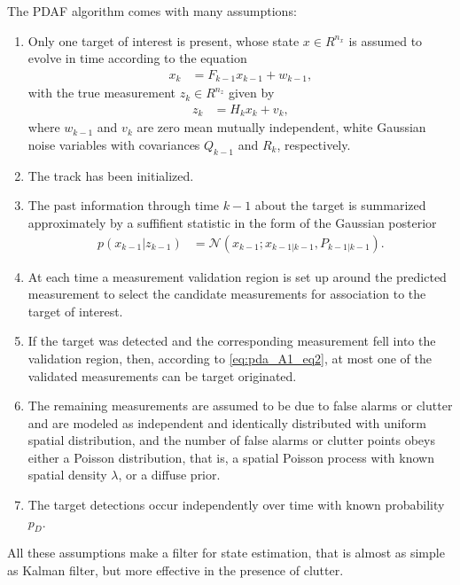 The PDAF algorithm comes with many assumptions:
\begin{enumerate}
    \item Only one target of interest is present, whose state $x \in R^{n_x}$ is assumed to evolve in time according to the equation
        \begin{align}
            x_k &= F_{k-1} x_{k-1} + w_{k-1},
        \end{align}
        with the true measurement $z_k \in R^{n_z}$ given by
        \begin{align}
            \label{eq:pda_A1_eq2}
            z_k &= H_k x_k + v_k,
        \end{align}
        where $w_{k-1}$ and $v_k$ are zero mean mutually independent, white Gaussian noise variables with covariances $Q_{k-1}$ and $R_k$, respectively.
    \item The track has been initialized.
    \item The past information through time $k-1$ about the target is summarized approximately by a suffifient statistic in the form of the Gaussian posterior
        \begin{align}
            p(x_{k-1}|z_{k-1}) &= \mathcal{N}(x_{k-1}; x_{k-1|k-1}, P_{k-1|k-1}). \label{eq:pda_A3}
        \end{align}
    \item At each time a measurement validation region is set up around the predicted measurement to select the candidate measurements for association to the target of interest.
    \item If the target was detected and the corresponding
    measurement fell into the validation region, then,
    according to \eqref{eq:pda_A1_eq2}, at most one of the validated measurements can be target originated.
    \item The remaining measurements are assumed to be due
    to false alarms or clutter and are modeled as independent and identically distributed with uniform spatial distribution, and the number of false alarms or clutter points obeys either a Poisson distribution, that is, a spatial Poisson process with known
    spatial density $\lambda$, or a diffuse prior.
    \item The target detections occur independently over time
    with known probability $p_D$.
\end{enumerate}
All these assumptions make a filter for state estimation, that is almost as simple as Kalman filter, but more effective in the presence of clutter.

